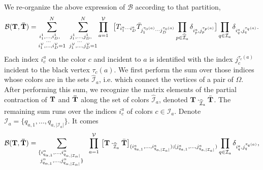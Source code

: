 \documentclass[aps,prd,10pt,notitlepage,nofootinbib,superscriptaddress,showkeys,showpacs]{revtex4-1}
\begin{document}
We re-organize the above expression of ${\mathcal{B}}$ according to that partition,
\begin{equation}
{\mathcal{B}}({\bf T}, {\bf \bar T})=
\sum_{  \substack {  { i^1_{1},\dotsc, i^1_{D},\ \   }   \\ {\dotsc\ \ \ }  \\ { i^{\mathcal{V}}_{1},\dotsc, i^{\mathcal{V}}_{D}=1  }  }   }^N\ 
 \sum_{  \substack {  { j^1_{1},\dotsc, j^1_{D},\ \   }   \\ {\dotsc\ \ \ }  \\ { j^{\mathcal{V}}_{1},\dotsc, j^{\mathcal{V}}_{D}=1  }  }   }^N
 \prod_{a=1}^{\mathcal{V}}\ \ \bigl[ T_{i^a_1 \dotsb i^a_D}\bar T_{j^{\tau_0(a)}_{1}\dotsb j^{\tau_0(a)}_{D}}
 \prod_{p\in {\widehat{\mathcal{I}}}_a} \delta_{i_p^a, j_p^{\tau_p(a)}} \bigr] 
 \prod_{q\in {\mathcal{I}}_a} \delta_{i_{q}^a, j_{q}^{\tau_q(a)}}.
\end{equation}
Each index $i_c^a$ on the color $c$ and incident to $a$ is identified with the index $j^{\tau_c(a)}_c$ incident to the black vertex $\tau_c(a)$. We first perform the sum over those indices whose colors are in the sets ${\widehat{\mathcal{I}}}_a$, i.e. which connect the vertices of a pair of $\Omega$. After performing this sum, we recognize the matrix elements of the partial contraction of ${\bf T}$ and ${\bf \bar T}$ along the set of colors ${\widehat{\mathcal{I}}}_a$, denoted ${\bf T}\cdot_{{\widehat{\mathcal{I}}}_{a}}\bar {\bf T}$. The remaining sum runs over the indices $i_c^a$ of colors $c\in{\mathcal{I}}_a$. Denote ${\mathcal{I}}_a = \{  q_{a,1}, ... ,q_{a,\lvert{\mathcal{I}}_a\rvert}  \}$. It comes 
\begin{equation}
\label{bubble}
{\mathcal{B}}({\bf T}, {\bf \bar T}) =
\sum_ {   
\substack {
{   \{i^\alpha_{q_{\alpha,1}},\dotsc, i^\alpha_{q_{\alpha,\lvert{\mathcal{I}}_\alpha\rvert}}\ \   }\\
{   j^\alpha_{q_{\alpha,1}},\dotsc, j^\alpha_{q_{\alpha,\lvert{\mathcal{I}}_\alpha\rvert}}\}   }
}
}\ 
 \prod_{a=1}^{\mathcal{V}}\ \bigl[ {\bf T}\cdot_{{\widehat{\mathcal{I}}}_{a}}\bar {\bf T}\bigr]_{ (i^a_{q_{a,1}},\dotsc, i^a_{q_{a,\lvert{\mathcal{I}}_a\rvert}}); (j^a_{q_{a,1}},\dotsc, j^a_{q_{a,\lvert{\mathcal{I}}_a\rvert}})    } \prod_{q\in{\mathcal{I}}_a  } \delta_{i_q^a, j_q^{\tau_q(a)}},
\end{equation}
\end{document}
